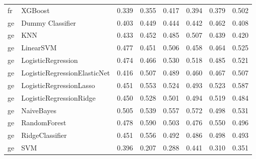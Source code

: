 \begin{tabular}{llllllll}
      fr &                      XGBoost & 0.339 &                     0.355 &                 0.417 &                  0.394 &                                   0.379 &     0.502 \\
      ge &             Dummy Classifier & 0.403 &                     0.449 &                 0.444 &                  0.442 &                                   0.462 &     0.408 \\
      ge &                          KNN & 0.433 &                     0.452 &                 0.485 &                  0.507 &                                   0.439 &     0.420 \\
      ge &                    LinearSVM & 0.477 &                     0.451 &                 0.506 &                  0.458 &                                   0.464 &     0.525 \\
      ge &           LogisticRegression & 0.474 &                     0.466 &                 0.530 &                  0.518 &                                   0.485 &     0.521 \\
      ge & LogisticRegressionElasticNet & 0.416 &                     0.507 &                 0.489 &                  0.460 &                                   0.467 &     0.507 \\
      ge &      LogisticRegressionLasso & 0.451 &                     0.553 &                 0.524 &                  0.493 &                                   0.523 &     0.587 \\
      ge &      LogisticRegressionRidge & 0.450 &                     0.528 &                 0.501 &                  0.494 &                                   0.519 &     0.484 \\
      ge &                   NaiveBayes & 0.505 &                     0.539 &                 0.557 &                  0.572 &                                   0.498 &     0.531 \\
      ge &                 RandomForest & 0.478 &                     0.590 &                 0.503 &                  0.476 &                                   0.550 &     0.496 \\
      ge &              RidgeClassifier & 0.451 &                     0.556 &                 0.492 &                  0.486 &                                   0.498 &     0.493 \\
      ge &                          SVM & 0.396 &                     0.207 &                 0.288 &                  0.441 &                                   0.310 &     0.351 \\

\end{tabular}
